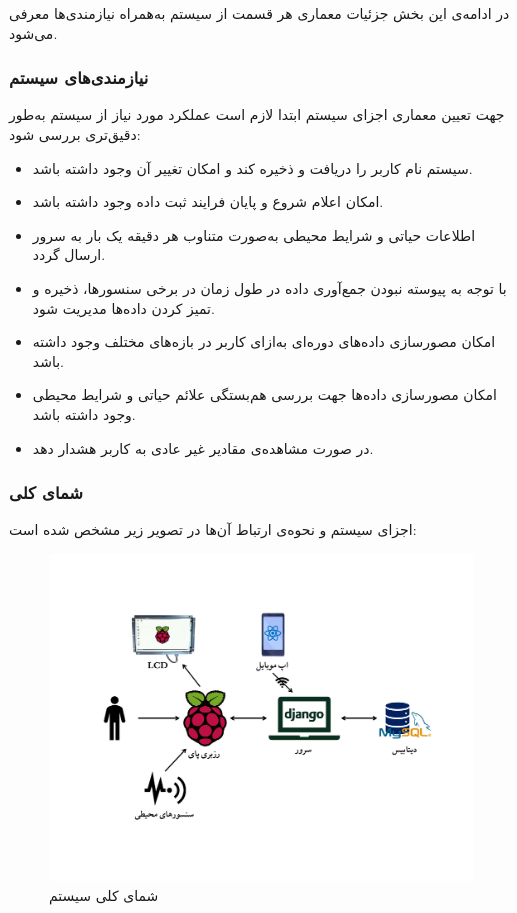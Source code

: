 \documentclass[12pt]{article}
\begin{document}
در ادامه‌ی این بخش جزئیات معماری هر قسمت از سیستم به‌همراه نیازمندی‌ها معرفی می‌شود.

\subsubsection{نیازمندی‌های سیستم}
جهت تعیین معماری اجزای سیستم ابتدا لازم است عملکرد مورد نیاز از سیستم به‌طور دقیق‌تری بررسی شود:
\begin{itemize}
	\item سیستم نام کاربر را دریافت و ذخیره کند و امکان تغییر آن وجود داشته باشد.
	\item امکان اعلام شروع و پایان فرایند ثبت داده وجود داشته باشد.
	\item اطلاعات حیاتی و شرایط محیطی به‌صورت متناوب هر دقیقه یک بار به سرور ارسال گردد.
	\item با توجه به پیوسته نبودن جمع‌آوری داده در طول زمان در برخی سنسورها، ذخیره و تمیز کردن داده‌ها مدیریت شود.
	\item امکان مصورسازی داده‌های دوره‌ای به‌ازای کاربر در بازه‌های مختلف وجود داشته باشد.
	\item امکان مصورسازی داده‌ها جهت بررسی هم‌بستگی علائم حیاتی و شرایط محیطی وجود داشته باشد.
	\item در صورت مشاهده‌ی مقادیر غیر عادی به کاربر هشدار دهد.
\end{itemize}

\subsubsection{شمای کلی}
اجزای سیستم و نحوه‌ی ارتباط آن‌ها در تصویر زیر مشخص شده است:
\begin{figure}[h]
	\begin{center}
		\includegraphics[width=\textwidth,trim={1cm 4cm 1cm 4cm},clip]{project_architecture}
	\end{center}
	\caption{شمای کلی سیستم}
\end{figure}
\end{document}
